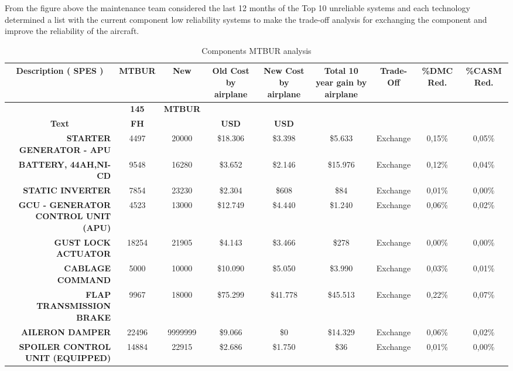 From the figure above the maintenance team considered the last 12 months of the Top 10 unreliable systems and each technology determined a list with the current component low reliability systems to make the trade-off analysis for exchanging the component and improve the reliability of the aircraft.

\begin{table}[htbp]
  \centering
  \caption{Components MTBUR analysis}
    \begin{tabular}{rcccccccc}
    \toprule
    \multicolumn{1}{c}{\multirow{2}[4]{*}{\textbf{Description ( SPES )}}} & \textbf{MTBUR} & \textbf{New} & \multirow{2}[4]{*}{\textbf{Old Cost by airplane}} & \multirow{2}[4]{*}{\textbf{New Cost by airplane}} & \multirow{2}[4]{*}{\textbf{Total 10 year gain by airplane}} & \multirow{2}[4]{*}{\textbf{Trade-Off}} & \multirow{2}[4]{*}{\textbf{\%DMC Red.}} & \multirow{2}[4]{*}{\textbf{\%CASM Red.}} \\
    \midrule
    \multicolumn{1}{c}{} & \textbf{145} & \textbf{MTBUR} &       &       &       &       &       &  \\
    \multicolumn{1}{c}{\textbf{Text}} & \textbf{FH} & \textbf{} & \textbf{USD} & \textbf{USD} & \textbf{} & \textbf{} & \textbf{} & \textbf{} \\
    \textbf{STARTER GENERATOR - APU} & 4497  & 20000 & \$18.306 & \$3.398 & \$5.633 & Exchange & 0,15\% & 0,05\% \\
    \textbf{BATTERY, 44AH,NI-CD} & 9548  & 16280 & \$3.652 & \$2.146 & \$15.976 & Exchange & 0,12\% & 0,04\% \\
    \textbf{STATIC INVERTER} & 7854  & 23230 & \$2.304 & \$608 & \$84  & Exchange & 0,01\% & 0,00\% \\
    \textbf{GCU - GENERATOR CONTROL UNIT (APU)} & 4523  & 13000 & \$12.749 & \$4.440 & \$1.240 & Exchange & 0,06\% & 0,02\% \\
    \textbf{GUST LOCK ACTUATOR} & 18254 & 21905 & \$4.143 & \$3.466 & \$278 & Exchange & 0,00\% & 0,00\% \\
    \textbf{CABLAGE COMMAND} & 5000  & 10000 & \$10.090 & \$5.050 & \$3.990 & Exchange & 0,03\% & 0,01\% \\
    \textbf{FLAP TRANSMISSION BRAKE} & 9967  & 18000 & \$75.299 & \$41.778 & \$45.513 & Exchange & 0,22\% & 0,07\% \\
    \textbf{AILERON DAMPER} & 22496 & 9999999 & \$9.066 & \$0   & \$14.329 & Exchange & 0,06\% & 0,02\% \\
    \textbf{SPOILER CONTROL UNIT (EQUIPPED)} & 14884 & 22915 & \$2.686 & \$1.750 & \$36  & Exchange & 0,01\% & 0,00\% \\

\end{tabular}
\end{table}
